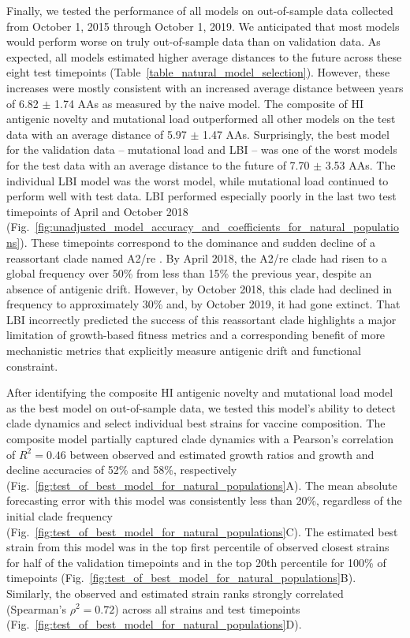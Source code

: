 Finally, we tested the performance of all models on out-of-sample data collected from October 1, 2015 through October 1, 2019.
We anticipated that most models would perform worse on truly out-of-sample data than on validation data.
As expected, all models estimated higher average distances to the future across these eight test timepoints (Table~\ref{table_natural_model_selection}).
However, these increases were mostly consistent with an increased average distance between years of 6.82 $\pm$ 1.74 AAs as measured by the naive model.
The composite of HI antigenic novelty and mutational load outperformed all other models on the test data with an average distance of 5.97 $\pm$ 1.47 AAs.
Surprisingly, the best model for the validation data -- mutational load and LBI -- was one of the worst models for the test data with an average distance to the future of 7.70 $\pm$ 3.53 AAs.
The individual LBI model was the worst model, while mutational load continued to perform well with test data.
LBI performed especially poorly in the last two test timepoints of April and October 2018 (Fig.~\ref{fig:unadjusted_model_accuracy_and_coefficients_for_natural_populations}).
These timepoints correspond to the dominance and sudden decline of a reassortant clade named A2/re \cite{Potter2019}.
By April 2018, the A2/re clade had risen to a global frequency over 50\% from less than 15\% the previous year, despite an absence of antigenic drift.
However, by October 2018, this clade had declined in frequency to approximately 30\% and, by October 2019, it had gone extinct.
That LBI incorrectly predicted the success of this reassortant clade highlights a major limitation of growth-based fitness metrics and a corresponding benefit of more mechanistic metrics that explicitly measure antigenic drift and functional constraint.

After identifying the composite HI antigenic novelty and mutational load model as the best model on out-of-sample data, we tested this model's ability to detect clade dynamics and select individual best strains for vaccine composition.
The composite model partially captured clade dynamics with a Pearson's correlation of $R^2 = 0.46$ between observed and estimated growth ratios and growth and decline accuracies of 52\% and 58\%, respectively (Fig.~\ref{fig:test_of_best_model_for_natural_populations}A).
The mean absolute forecasting error with this model was consistently less than 20\%, regardless of the initial clade frequency (Fig.~\ref{fig:test_of_best_model_for_natural_populations}C).
The estimated best strain from this model was in the top first percentile of observed closest strains for half of the validation timepoints and in the top 20th percentile for 100\% of timepoints (Fig.~\ref{fig:test_of_best_model_for_natural_populations}B).
Similarly, the observed and estimated strain ranks strongly correlated (Spearman's $\rho^2 = 0.72$) across all strains and test timepoints (Fig.~\ref{fig:test_of_best_model_for_natural_populations}D).

